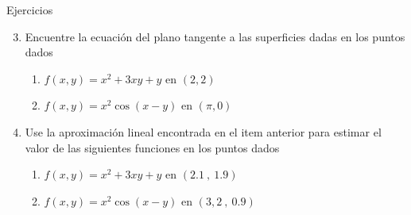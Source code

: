 \begin{frame}{Ejercicios}
  \begin{enumerate}
    \setcounter{enumi}{2}
    \item Encuentre la ecuación del plano tangente a las superficies dadas en los puntos dados\\[0.25cm]
      \begin{enumerate}
        \item $f(x,y)=x^2+3xy+y$ en $(2,2)$
        \item $f(x,y)=x^2\cos(x-y)$ en $(\pi,0)$
      \end{enumerate}
    \vspace{0.5cm}
    \item Use la aproximación lineal encontrada en el item anterior para estimar el valor de las siguientes funciones en los puntos dados\\[0.25cm]
      \begin{enumerate}
        \item $f(x,y)=x^2+3xy+y$ en $(2.1\ ,\ 1.9)$
        \item $f(x,y)=x^2\cos(x-y)$ en $(3,2\ ,\ 0.9)$
      \end{enumerate}
  \end{enumerate}
\end{frame}

